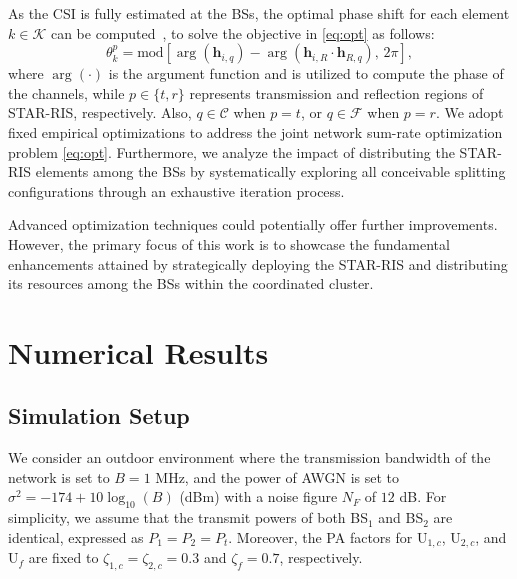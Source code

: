 \documentclass[conference]{IEEEtran}
\begin{document}
As the CSI is fully estimated at the BSs, the optimal phase shift for each element $k \in \mathcal{K}$ can be computed~\cite{wu2019intelligent}, to solve the objective in \ref{eq:opt} as follows:
\begin{equation}
    \theta_k^p = \text{mod}[\arg(\textbf{h}_{i,q}) - \arg(\textbf{h}_{i,R}\cdot \textbf{h}_{R, q}),\,2\pi],
\end{equation}
where $\arg(\cdot)$ is the argument function and is utilized to compute the phase of the channels, while $p \in \{t, r\}$ represents transmission and reflection regions of STAR-RIS, respectively. Also, $q \in \mathcal{C}$ when $p=t$, or $q \in \mathcal{F}$ when $p=r$. We adopt fixed empirical optimizations to address the joint network sum-rate optimization problem \ref{eq:opt}. Furthermore, we analyze the impact of distributing the STAR-RIS elements among the BSs by systematically exploring all conceivable splitting configurations through an exhaustive iteration process.

Advanced optimization techniques could potentially offer further improvements. However, the primary focus of this work is to showcase the fundamental enhancements attained by strategically deploying the STAR-RIS and distributing its resources among the BSs within the coordinated cluster.

\section{Numerical Results}
\subsection{Simulation Setup}
We consider an outdoor environment where the transmission bandwidth of the network is set to $B = 1$ MHz, and the power of AWGN is set to $\sigma^2 = -174 + 10\log_{10}\left(B\right)$ (dBm) with a noise figure $N_F$ of $12$ dB. For simplicity, we assume that the transmit powers of both BS$_1$ and BS$_2$ are identical, expressed as $P_1 = P_2 = P_t$. Moreover, the PA factors for U$_{1,c}$, U$_{2,c}$, and U$_f$ are fixed to $\zeta_{1,c}=\zeta_{2,c}=0.3$ and $\zeta_f=0.7$, respectively.
\end{document}

